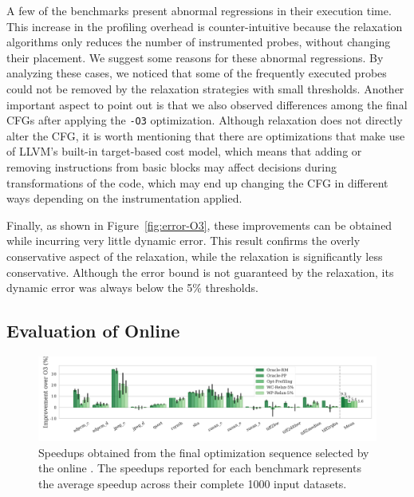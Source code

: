 A few of the benchmarks present abnormal regressions in their execution time.
This increase in the profiling overhead is counter-intuitive because the
relaxation algorithms only reduces the number of instrumented probes,
without changing their placement.
We suggest some reasons for these abnormal regressions.
By analyzing these cases, we noticed that some of the frequently executed
probes could not be removed by the relaxation strategies with small thresholds.
Another important aspect to point out is that we also observed
differences among the final CFGs after applying the \texttt{-O3} optimization.
Although relaxation does not directly alter the CFG, it is worth mentioning that
there are optimizations that make use of LLVM's built-in target-based cost model,
which means that adding or removing instructions from basic blocks may affect
decisions during transformations of the code, which may end up changing the CFG
in different ways depending on the instrumentation applied.

Finally, as shown in Figure~\ref{fig:error-O3}, these improvements can be
obtained while incurring very little dynamic error.
This result confirms the overly conservative aspect of the \WCRelaxLower relaxation,
while the \WPRelaxLower relaxation is significantly less conservative.
Although the error bound is not guaranteed by the \WPRelaxLower relaxation,
its dynamic error was always below the 5\% thresholds.

\subsection{Evaluation of Online {\IterComp}}

\begin{figure}[t]
    \centering
    \includegraphics[width=\textwidth]{figs/speedups.pdf}
    \caption{Speedups obtained from the final optimization sequence selected by the online {\itercomp}.
	         The speedups reported for each benchmark represents the average speedup across their complete 1000 input datasets.}
    \label{fig:speedups}
\end{figure}

